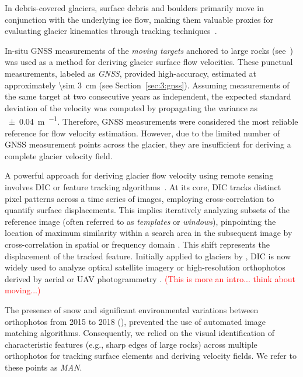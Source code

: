 In debris-covered glaciers, surface debris and boulders primarily move in conjunction with the underlying
ice flow, making them valuable proxies for evaluating glacier kinematics through tracking 
techniques~\citep{Dehecq2015, Sam2016, Blothe2021}.

In-situ GNSS measurements of the \textit{moving targets} anchored to large rocks (see~)
was used as a method for deriving glacier surface flow velocities.
These punctual measurements, labeled as \textit{GNSS}, provided high-accuracy, 
estimated at approximately \qty{\sim 3}{\centi\meter} (see Section~\ref{sec:3:gnss}).
Assuming measurements of the same target at two consecutive years as independent, the expected standard deviation 
of the velocity was computed by propagating the variance as \qty{\pm 0.04}{\meter\per\year}.
Therefore, GNSS measurements were considered the most reliable reference for flow velocity estimation.
However, due to the limited number of GNSS measurement points across the glacier, they are insufficient 
for deriving a complete glacier velocity field.

A powerful approach for deriving glacier flow velocity using remote sensing involves DIC or 
feature tracking algorithms~\citep{ahn_box_2010, Giordan2016, Hadhri2019}.
At its core, DIC tracks distinct pixel patterns across a time series of images, employing cross-correlation to quantify 
surface displacements. 
This implies iteratively analyzing subsets of the reference image (often referred to as \textit{templates} 
or \textit{windows}), pinpointing the location of maximum similarity within a search area in the subsequent 
image by cross-correlation in spatial \citep{Scambos1992} or frequency domain \citep{rolstad1997}.
This shift represents the displacement of the tracked feature.
Initially applied to glaciers by \cite{Scambos1992}, DIC is now widely used to analyze optical satellite imagery
\citep{Scambos1992, Scherler2008, Heid2012_evaluation_xcorr} or high-resolution orthophotos derived by aerial or 
UAV photogrammetry \citep{immerzeel2014, Chudley2019, ioli2021mid}. \textcolor{red}{(This is more an intro... think about moving...)}

The presence of snow and significant environmental variations between orthophotos from 2015 to 2018 (),
prevented the use of automated image matching algorithms. 
Consequently, we relied on the visual identification of characteristic features (e.g., sharp edges of large rocks) across multiple 
orthophotos \citep{Lucchitta1986} for tracking surface elements and deriving velocity fields. 
We refer to these points as \textit{MAN}.


